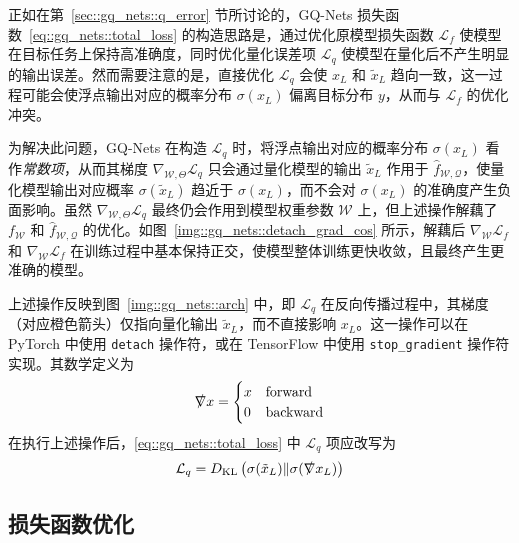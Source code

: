正如在第~\ref{sec::gq_nets::q_error} 节所讨论的，GQ-Nets 损失函数~\eqref{eq::gq_nets::total_loss} 的构造思路是，通过优化原模型损失函数 $\mathcal{L}_f$ 使模型在目标任务上保持高准确度，同时优化量化误差项 $\mathcal{L}_q$ 使模型在量化后不产生明显的输出误差。然而需要注意的是，直接优化 $\mathcal{L}_q$ 会使 $x_L$ 和 $\tilde{x}_L$ 趋向一致，这一过程可能会使浮点输出对应的概率分布 $\sigma(x_L)$ 偏离目标分布 $y$，从而与 $\mathcal{L}_f$ 的优化冲突。

为解决此问题，GQ-Nets 在构造 $\mathcal{L}_q$ 时，将浮点输出对应的概率分布 $\sigma(x_L)$ 看作\emph{常数项}，从而其梯度 $\nabla_{\mathcal{W}, \Theta} \mathcal{L}_q$ 只会通过量化模型的输出 $\tilde{x}_L$ 作用于 $\hat{f}_{\mathcal{W, Q}}$，使量化模型输出对应概率 $\sigma(\tilde{x}_L)$ 趋近于 $\sigma(x_L)$，而不会对 $\sigma(x_L)$ 的准确度产生负面影响。虽然 $\nabla_{\mathcal{W}, \Theta} \mathcal{L}_q$ 最终仍会作用到模型权重参数 $\mathcal{W}$ 上，但上述操作解藕了 $f_{\mathcal{W}}$ 和 $\hat{f}_{\mathcal{W, Q}}$ 的优化。如图~\ref{img::gq_nets::detach_grad_cos} 所示，解藕后 $\nabla_{\mathcal{W}} \mathcal{L}_f$ 和 $\nabla_{\mathcal{W}} \mathcal{L}_f$ 在训练过程中基本保持正交，使模型整体训练更快收敛，且最终产生更准确的模型。

上述操作反映到图~\ref{img::gq_nets::arch} 中，即 $\mathcal{L}_q$ 在反向传播过程中，其梯度（对应橙色箭头）仅指向量化输出 $\tilde{x}_L$，而不直接影响 $x_L$。这一操作可以在 PyTorch 中使用 \verb|detach| 操作符，或在 TensorFlow 中使用 \verb|stop_gradient| 操作符实现。其数学定义为
\begin{align}
  \slashed{\nabla} x =
    \begin{cases}
      x & \text{forward} \\
      0 & \text{backward}
    \end{cases}
\end{align}
在执行上述操作后，\eqref{eq::gq_nets::total_loss} 中 $\mathcal{L}_q$ 项应改写为
\begin{align}
  \mathcal{L}_q = D_{\mathrm{KL}}\left( \sigma(\tilde{x}_L) \| \sigma(\slashed{\nabla} x_L) \right)
\end{align}
\subsection{损失函数优化} \label{sec::gq_nets::optimize_loss_func}

